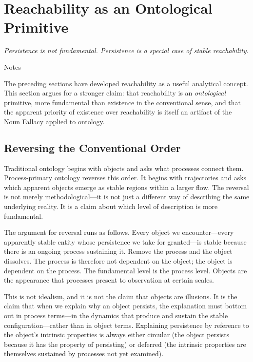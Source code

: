 \documentclass[12pt, a4paper]{article}
\theoremstyle{plain}
\theoremstyle{definition}
\theoremstyle{remark}
\begin{document}
\section{Reachability as an Ontological Primitive}
\label{sec:ontprim}

\epigraph{\textit{Persistence is not fundamental. Persistence is a special
case of stable reachability.}}{Notes}

\noindent
The preceding sections have developed reachability as a useful analytical
concept. This section argues for a stronger claim: that reachability is an
\emph{ontological} primitive, more fundamental than existence in the
conventional sense, and that the apparent priority of existence over
reachability is itself an artifact of the Noun Fallacy applied to ontology.

\subsection{Reversing the Conventional Order}

Traditional ontology begins with objects and asks what processes connect
them. Process-primary ontology reverses this order. It begins with
trajectories and asks which apparent objects emerge as stable regions within
a larger flow. The reversal is not merely methodological---it is not just
a different way of describing the same underlying reality. It is a claim
about which level of description is more fundamental.

The argument for reversal runs as follows. Every object we encounter---every
apparently stable entity whose persistence we take for granted---is stable
because there is an ongoing process sustaining it. Remove the process and the
object dissolves. The process is therefore not dependent on the object;
the object is dependent on the process. The fundamental level is the
process level. Objects are the appearance that processes present to
observation at certain scales.

This is not idealism, and it is not the claim that objects are illusions.
It is the claim that when we explain why an object persists, the explanation
must bottom out in process terms---in the dynamics that produce and sustain
the stable configuration---rather than in object terms. Explaining persistence
by reference to the object's intrinsic properties is always either circular
(the object persists because it has the property of persisting) or deferred
(the intrinsic properties are themselves sustained by processes not yet
examined).
\end{document}

